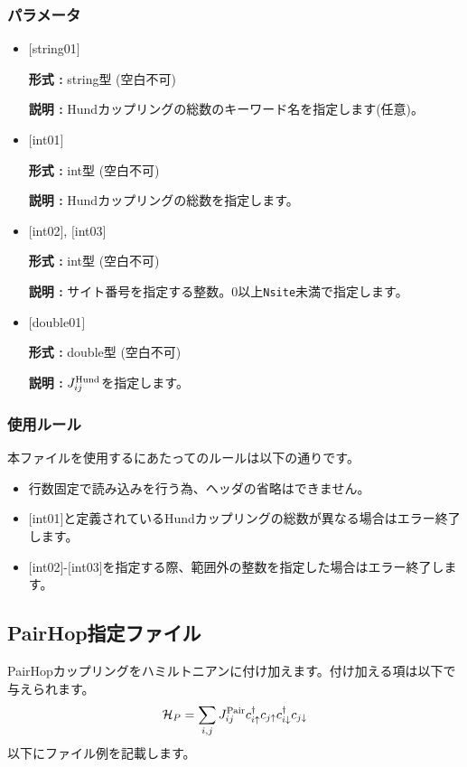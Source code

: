 \subsubsection{パラメータ}
 \begin{itemize}

   \item  $[$string01$]$
   
    {\bf 形式 :} string型 (空白不可)

   {\bf 説明 :} Hundカップリングの総数のキーワード名を指定します(任意)。

   \item  $[$int01$]$
   
    {\bf 形式 :} int型 (空白不可)

   {\bf 説明 :} Hundカップリングの総数を指定します。

  \item  $[$int02$]$, $[$int03$]$
  
 {\bf 形式 :} int型 (空白不可)

{\bf 説明 :} サイト番号を指定する整数。0以上\verb|Nsite|{未満}で指定します。
 
 \item  $[$double01$]$
   
   {\bf 形式 :} double型 (空白不可)

  {\bf 説明 :}  $J_{ij}^{\rm Hund}$を指定します。
  
\end{itemize}

\subsubsection{使用ルール}
本ファイルを使用するにあたってのルールは以下の通りです。
\begin{itemize}
\item 行数固定で読み込みを行う為、ヘッダの省略はできません。
\item $[$int01$]$と定義されているHundカップリングの総数が異なる場合はエラー終了します。
\item $[$int02$]$-$[$int03$]$を指定する際、範囲外の整数を指定した場合はエラー終了します。
\end{itemize}

\newpage
\subsection{PairHop指定ファイル}
PairHopカップリングをハミルトニアンに付け加えます。付け加える項は以下で与えられます。
\begin{equation}
{\cal H}_P=\sum_{i,j}J_{ij}^{\rm Pair} c_ {i \uparrow}^{\dag}c_{j\uparrow}c_{i \downarrow}^{\dag}c_{j  \downarrow}
\end{equation}
以下にファイル例を記載します。

